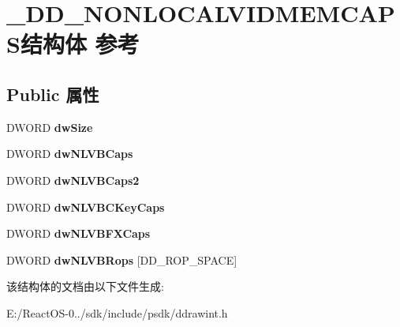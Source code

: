 \hypertarget{struct___d_d___n_o_n_l_o_c_a_l_v_i_d_m_e_m_c_a_p_s}{}\section{\+\_\+\+D\+D\+\_\+\+N\+O\+N\+L\+O\+C\+A\+L\+V\+I\+D\+M\+E\+M\+C\+A\+P\+S结构体 参考}
\label{struct___d_d___n_o_n_l_o_c_a_l_v_i_d_m_e_m_c_a_p_s}
\subsection*{Public 属性}
\begin{DoxyCompactItemize}
\item 
\mbox{\label{struct___d_d___n_o_n_l_o_c_a_l_v_i_d_m_e_m_c_a_p_s_abd3cb01e0d0eed63713bf6e10f182428}} 
D\+W\+O\+RD {\bfseries dw\+Size}
\item 
\mbox{\label{struct___d_d___n_o_n_l_o_c_a_l_v_i_d_m_e_m_c_a_p_s_a6c5db8279ce994feacaa0b8a2de230d3}} 
D\+W\+O\+RD {\bfseries dw\+N\+L\+V\+B\+Caps}
\item 
\mbox{\label{struct___d_d___n_o_n_l_o_c_a_l_v_i_d_m_e_m_c_a_p_s_ad1cf34de215bf2956d8ec519801e0cd4}} 
D\+W\+O\+RD {\bfseries dw\+N\+L\+V\+B\+Caps2}
\item 
\mbox{\label{struct___d_d___n_o_n_l_o_c_a_l_v_i_d_m_e_m_c_a_p_s_a2fa9e41a161902dc6d24ad18b7957d37}} 
D\+W\+O\+RD {\bfseries dw\+N\+L\+V\+B\+C\+Key\+Caps}
\item 
\mbox{\label{struct___d_d___n_o_n_l_o_c_a_l_v_i_d_m_e_m_c_a_p_s_ae5c6473b9e29bbb49d892a64f0036dd4}} 
D\+W\+O\+RD {\bfseries dw\+N\+L\+V\+B\+F\+X\+Caps}
\item 
\mbox{\label{struct___d_d___n_o_n_l_o_c_a_l_v_i_d_m_e_m_c_a_p_s_ab6f42fcadc4b976d0bb012ef439e8a51}} 
D\+W\+O\+RD {\bfseries dw\+N\+L\+V\+B\+Rops} \mbox{[}D\+D\+\_\+\+R\+O\+P\+\_\+\+S\+P\+A\+CE\mbox{]}
\end{DoxyCompactItemize}


该结构体的文档由以下文件生成\+:\begin{DoxyCompactItemize}
\item 
E\+:/\+React\+O\+S-\/0../sdk/include/psdk/ddrawint.\+h\end{DoxyCompactItemize}

